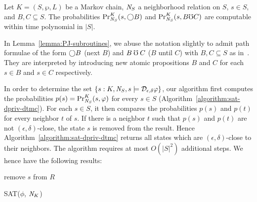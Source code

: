 \begin{lemma}
  Let $K = (S, \wp, L)$ be a Markov chain, $\neighbor{S}$ a
  neighborhood relation on $S$, $s
  \in S$, and $B, C \subseteq S$. The probabilities
  $\myPr{s}{K}{\neighbor{S}}{\gX B}$ and
  $\myPr{s}{K}{\neighbor{S}}{B \mho C}$ 
\hide{
  $\Pr[\{ \pi : K, \neighbor{K}, \pi \models B \buntil{n} C \textmd{
    with } \pi_0 = s \}]$
} are computable within time polynomial in
  $|S|$.
  \label{lemma:PJ-subroutines}
\end{lemma}

In Lemma~\ref{lemma:PJ-subroutines}, we abuse the notation slightly to
admit path formulae of the form $\gX B$ (next $B$) and
$B \guntil C$ ($B$ until $C$) with $B, C \subseteq S$ as
in~\cite{BK:08:PMC}. They are interpreted by introducing new atomic
propositions $B$ and $C$ for each $s \in B$ and $s \in C$
respectively.

In order to determine the set $\{ s : K, \neighbor{S}, s \models
\dpriv{\epsilon}{\delta} \varphi \}$, our algorithm first computes
the probabilities $p (s) = \myPr{s}{K}{\neighbor{S}}{\varphi}$ for every
$s \in S$ (Algorithm~\ref{algorithm:sat-dpriv-dtmc}). For each $s \in S$,
it then compares the probabilities $p (s)$ and $p (t)$ for every
neighbor $t$ of $s$. If there is a neighbor $t$ such that $p (s)$ and
$p (t)$ are not $(\epsilon, \delta)$-close, the state $s$
is removed from the result. Hence
Algorithm~\ref{algorithm:sat-dpriv-dtmc} returns all states which are
$(\epsilon, \delta)$-close to their neighbors.
The algorithm requires at most $O
(|S|^2)$ additional steps. We hence have the following results:

\begin{algorithm}
  \begin{algorithmic}[1]
    \Match{$\phi$}
    \Case{$\X \Psi$}
    \EndCase
    \EndCase
    \EndMatch
        {remove $s$ from $R$}
        \EndIf
      \EndFor
    \EndFor

    \EndFunction
  \end{algorithmic}
  \caption{SAT($\phi$, $\neighbor{K}$)}
  \label{algorithm:sat-dpriv-dtmc}
\end{algorithm}

